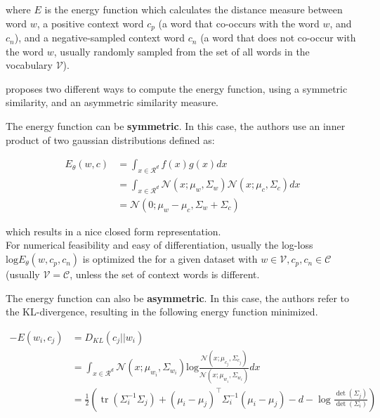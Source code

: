 \documentclass[a4paper,12pt,twoside,openright]{report}
\begin{document}
where $E$ is the energy function which calculates the distance measure between word $w$, a positive context word $c_p$ (a word that co-occurs with the word $w$, and $c_n$), and a negative-sampled context word $c_n$ (a word that does not co-occur with the word $w$, usually randomly sampled from the set of all words in the vocabulary $\mathcal{V}$).

\cite{vilnis14} proposes two different ways to compute the energy function, using a symmetric similarity, and an asymmetric similarity measure.



The energy function can be \textbf{symmetric}.
In this case, the authors use an inner product of two gaussian distributions defined as:

\begin{align}
E_\theta(w, c) &= \int_{x \in \mathcal{R}^d} f(x)g(x) dx \\
&= \int_{x \in \mathcal{R}^d} \mathcal{N}(x; \mu_w, \Sigma_w) \mathcal{N}(x; \mu_c, \Sigma_c) dx \\
&= \mathcal{N}(0; \mu_w - \mu_c, \Sigma_w + \Sigma_c)
\end{align}

which results in a nice closed form representation. \\

For numerical feasibility and easy of differentiation, usually the log-loss $\text{log} E_\theta(w, c_p, c_n)$ is optimized the for a given dataset with $w \in \mathcal{V}, c_p, c_n \in \mathcal{C}$ (usually $\mathcal{V} = \mathcal{C}$, unless the set of context words is different.


The energy function can also be \textbf{asymmetric}.
In this case, the authors refer to the KL-divergence, resulting in the following energy function minimized.

\begin{align}
-E(w_i, c_j) & = D_{KL}(c_j || w_i) \\
&= \int_{x \in \mathcal{R}^d} \mathcal{N}(x; \mu_{w_i}, \Sigma_{w_i}) \text{log} \frac{\mathcal{N}(x; \mu_{c_j}, \Sigma_{c_j})}{\mathcal{N}(x; \mu_{w_i}, \Sigma_{w_i})} dx \\
&= \frac{1}{2}\left(\operatorname{tr}\left(\Sigma_{i}^{-1} \Sigma_{j}\right)+\left(\mu_{i}-\mu_{j}\right)^{\top} \Sigma_{i}^{-1}\left(\mu_{i}-\mu_{j}\right)-d-\log \frac{\operatorname{det}\left(\Sigma_{j}\right)}{\operatorname{det}\left(\Sigma_{i}\right)}\right)
\end{align}
\end{document}
